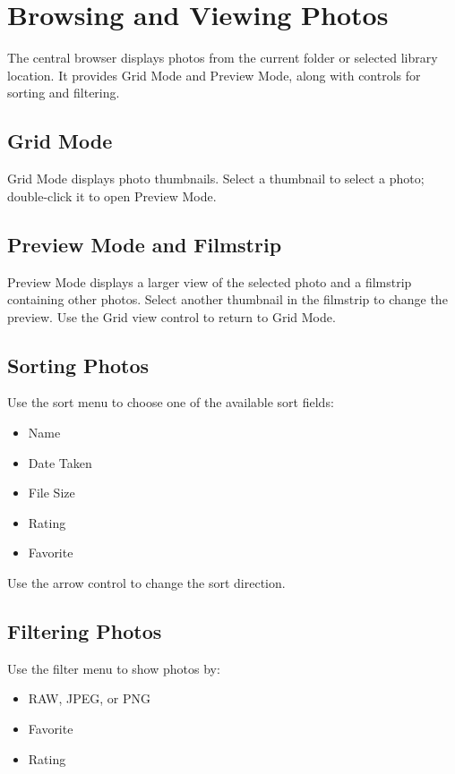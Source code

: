 \documentclass[11pt]{article}
\begin{document}
\section{Browsing and Viewing Photos}

The central browser displays photos from the current folder or selected
library location. It provides Grid Mode and Preview Mode, along with controls
for sorting and filtering.

\subsection{Grid Mode}

Grid Mode displays photo thumbnails. Select a thumbnail to select a photo;
double-click it to open Preview Mode.

\subsection{Preview Mode and Filmstrip}

Preview Mode displays a larger view of the selected photo and a filmstrip
containing other photos. Select another thumbnail in the filmstrip to change
the preview. Use the Grid view control to return to Grid Mode.

\subsection{Sorting Photos}

Use the sort menu to choose one of the available sort fields:
\begin{itemize}
  \item Name
  \item Date Taken
  \item File Size
  \item Rating
  \item Favorite
\end{itemize}

Use the arrow control to change the sort direction.

\subsection{Filtering Photos}

Use the filter menu to show photos by:

\begin{itemize}
  \item RAW, JPEG, or PNG
  \item Favorite
  \item Rating
\end{itemize}
\end{document}
